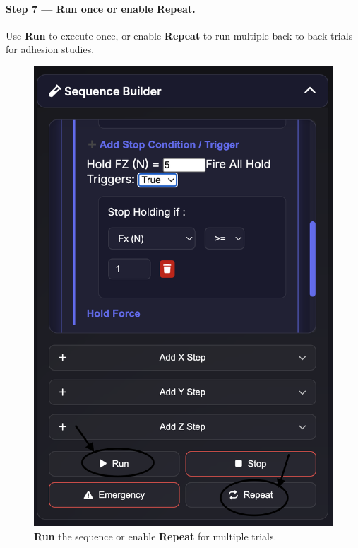 \documentclass[
    twocolumn,
    fontsize = 10pt,
    parskip = half+,
    headings = small,
    headwidth = text,
    footwidth = text,
]{scrartcl}
\begin{document}
\paragraph{\textbf{Step 7 — Run once or enable Repeat.}}
Use \textbf{Run} to execute once, or enable \textbf{Repeat} to run multiple back-to-back trials for adhesion studies.
\begin{figure}[htbp]\centering
  \includegraphics[width=.9\linewidth]{pics/sb-6.png}
  \caption{\textbf{Run} the sequence or enable \textbf{Repeat} for multiple trials.}
  \label{fig:sb-6}
\end{figure}
\end{document}

